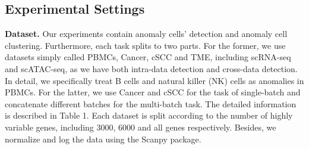 \documentclass{article}
\begin{document}
\begin{table}
    \centering
    \caption{Average F1*NMI score with standard deviation for fine-grained anomaly detection on single-cell transcriptomics datasets.}
    \label{tab:tab3}
\end{table}
\subsection{Experimental Settings}
\textbf{Dataset.}	Our experiments contain anomaly cells’ detection and anomaly cell 
clustering. Furthermore, each task splits to two parts. For the former, we use datasets 
simply called PBMCs, Cancer, cSCC and TME, including scRNA-seq and scATAC-seq, as we have both 
intra-data detection and cross-data detection. In detail, we specifically treat B cells 
and natural killer (NK) cells as anomalies in PBMCs. For the latter, we use Cancer and cSCC for 
the task of single-batch and concatenate different batches for the multi-batch task. The 
detailed information is described in Table 1. Each dataset is split according to the 
number of highly variable genes, including 3000, 6000 and all genes respectively. Besides, 
we normalize and log the data using the Scanpy \cite{scanpy} package.
\end{document}
